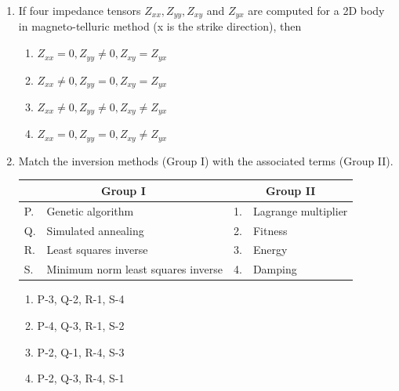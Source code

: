 \documentclass[journal,12pt,onecolumn]{IEEEtran}
\begin{document}
\begin{enumerate}
\hfill{}
\begin{multicols}{2}
\begin{enumerate}
    \item Fixed vertical loop method
    \item Compensator method
    \item TURAM method
    \item Slingram method
\end{enumerate}
\end{multicols}

\item If four impedance tensors $Z_{xx}, Z_{yy}, Z_{xy}$ and $Z_{yx}$ are computed for a 2D body in magneto-telluric method (x is the strike direction), then

\hfill{}
\begin{enumerate}
    \item $Z_{xx} = 0, Z_{yy} \ne 0, Z_{xy} = Z_{yx}$
    \item $Z_{xx} \ne 0, Z_{yy} = 0, Z_{xy} = Z_{yx}$
    \item $Z_{xx} \ne 0, Z_{yy} \ne 0, Z_{xy} \ne Z_{yx}$
    \item $Z_{xx} = 0, Z_{yy} = 0, Z_{xy} \ne Z_{yx}$
\end{enumerate}

\item Match the inversion methods (Group I) with the associated terms (Group II).

\hfill{}
\begin{center}
\begin{tabular}{ll|ll}
\multicolumn{2}{c}{\textbf{Group I}} & \multicolumn{2}{c}{\textbf{Group II}} \\
\hline
P. & Genetic algorithm & 1. & Lagrange multiplier \\
Q. & Simulated annealing & 2. & Fitness \\
R. & Least squares inverse & 3. & Energy \\
S. & Minimum norm least squares inverse & 4. & Damping \\
\end{tabular}
\end{center}
\begin{multicols}{2}
\begin{enumerate}
    \item P-3, Q-2, R-1, S-4
    \item P-4, Q-3, R-1, S-2
    \item P-2, Q-1, R-4, S-3
    \item P-2, Q-3, R-4, S-1
\end{enumerate}
\end{multicols}





\end{enumerate}
\end{document}
